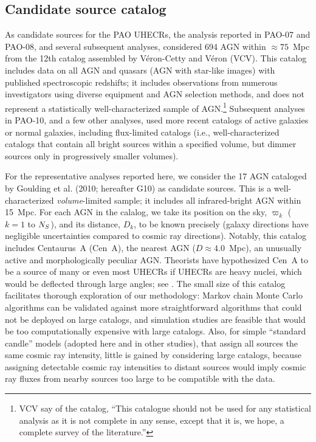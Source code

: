 \subsection{Candidate source catalog}

As candidate sources for the PAO UHECRs, the analysis reported in PAO-07 and
PAO-08, and several subsequent analyses, considered 694 
AGN within $\approx 75$~Mpc from the 12th catalog 
assembled by V\'eron-Cetty and V\'eron \cite{VCV-12thAGNCat} (VCV). 
This catalog includes data on all AGN and quasars (AGN with star-like
images) with published spectroscopic redshifts; it includes observations
from numerous investigators using diverse equipment and AGN selection
methods, and does not represent a statistically well-characterized sample of
AGN.\footnote{VCV say of the catalog, ``This catalogue should not be used
for any statistical analysis as it is not complete in any sense, except that
it is, we hope, a complete survey of the literature.''}
Subsequent analyses in PAO-10, and a few other analyses, used more recent
catalogs of active galaxies or normal galaxies, including flux-limited
catalogs (i.e., well-characterized catalogs that contain all bright sources
within a specified volume, but dimmer sources only in progressively smaller
volumes).


For the representative analyses reported here, we consider the 17 AGN
cataloged by Goulding et al.\cite{2010MNRAS.406..597G} (2010; hereafter G10)
as candidate sources.  This is a well-characterized {\em volume}-limited
sample; it includes all infrared-bright AGN within 15~Mpc.  
For each AGN in the calalog, we take its position on the sky, $\varpi_k$
($k=1$ to $N_S$), and its distance, $D_k$, to be known precisely (galaxy
directions have negligible uncertainties compared to cosmic ray directions).
Notably, this catalog includes Centaurus~A (Cen~A), the nearest AGN
($D\approx 4.0$~Mpc), an unusually active and morphologically peculiar AGN.
Theorists have hypothesized Cen~A to be a source of many or even most UHECRs
if UHECRs are heavy nuclei, which would be deflected through large angles;
see \cite{B+09-CenA,GBdS10-CenA,BdS12-CenA}.  The small size of this catalog
facilitates thorough exploration of our methodology: Markov chain Monte
Carlo algorithms can be validated against more straightforward algorithms
that could not be deployed on large catalogs, and simulation studies are
feasible that would be too computationally expensive with large catalogs.
Also, for simple ``standard candle'' models (adopted here and in other
studies), that assign all sources the same cosmic ray intensity, little is
gained by considering large catalogs, because assigning detectable cosmic
ray intensities to distant sources would imply cosmic ray fluxes from nearby
sources too large to be compatible with the data.

